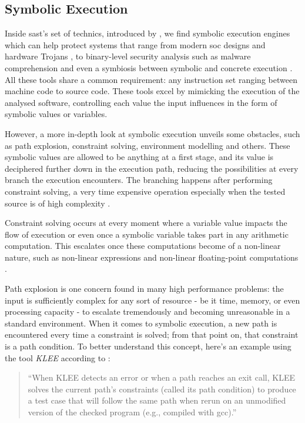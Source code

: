 \subsection{Symbolic Execution}
Inside \acrshort{sast}'s set of technics, introduced by \citet{King1976}, we find symbolic execution engines which can help protect systems that range from modern \acrfull{soc} designs and hardware Trojans \citep{Vafaei2021}, to binary-level security analysis such as malware comprehension \citep{David2016} and even a symbiosis between symbolic and concrete execution \citep{Gritti2020}.
All these tools share a common requirement: any instruction set ranging between machine code to source code. These tools excel by mimicking the execution of the analysed software, controlling each value the input influences in the form of symbolic values or variables.

However, a more in-depth look at symbolic execution unveils some obstacles, such as path explosion, constraint solving, environment modelling and others. These symbolic values are allowed to be anything at a first stage, and its value is deciphered further down in the execution path, reducing the possibilities at every branch the execution encounters. The branching happens after performing constraint solving, a very time expensive operation especially when the tested source is of high complexity \citep{Zhang2022}. 

Constraint solving occurs at every moment where a variable value impacts the flow of execution or even once a symbolic variable takes part in any arithmetic computation. This escalates once these computations become of a non-linear nature, such as non-linear expressions and non-linear floating-point computations \citep{Kroening2008}.

Path explosion is one concern found in many high performance problems: the input is sufficiently complex for any sort of resource - be it time, memory, or even processing capacity - to escalate tremendously and becoming unreasonable in a standard environment. When it comes to symbolic execution, a new path is encountered every time a constraint is solved; from that point on, that constraint is a path condition. To better understand this concept, here's an example using the tool \textit{KLEE} according to \citet[p. 3]{Cadar2008}: 
\begin{quote}
``When KLEE detects an error or when a path reaches an exit call, KLEE solves the current path's constraints (called its path condition) to produce a test case that will follow the same path when rerun on an unmodified version of the checked program (e.g., compiled with gcc).''
\end{quote}

